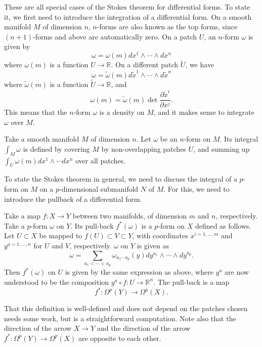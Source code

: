 \documentclass[12pt]{article}
\numberwithin{equation}{section}
\theoremstyle{remark}
\def\bR{\mathbb{R}}
\begin{document}
These are all special cases of the Stokes theorem for differential forms.
To state it, we first need to introduce the integration of a differential form.
On a smooth manifold $M$ of dimension $n$,
$n$-forms are also known as the top forms, 
since $(n+1)$-forms and above are automatically zero.
On a patch $U$, an $n$-form $\omega$ is given by \begin{equation}
\omega = \omega(m) dx^1\wedge \cdots \wedge dx^n
\end{equation} where $\omega(m)$ is a function $U\to \bR$.
On a different patch $\tilde U$, we have \begin{equation}
\omega = \tilde \omega(m) d\tilde x^1\wedge \cdots \wedge d\tilde x^n
\end{equation} where $\tilde \omega(m)$ is a function $\tilde U\to \bR$,
and \begin{equation}
\omega(m) = \tilde \omega(m) \det \frac{\partial \tilde x^i}{\partial x^j}.
\end{equation}
This means that the $n$-form $\omega$ is a density on $M$,
and it makes sense to integrate $\omega$ over $M$.
\begin{definition}
Take a smooth manifold $M$ of dimension $n$.
Let $\omega$ be an $n$-form on $M$.
Its integral $\int_M \omega$ is defined by covering $M$ by non-overlapping patches $U$,
and summing up $\int_U \omega(m) dx^1\wedge \cdots dx^n$ over all patches.
\end{definition}

To state the Stokes theorem in general,
we need to discuss the integral of a $p$-form on $M$ on a $p$-dimensional submanifold $N$ of $M$.
For this, we need to introduce the pullback of a differential form.
\begin{definition}
Take a map $f:X\to Y$ between two manifolds,
of dimension $m$ and $n$, respectively.
Take a $p$-form $\omega$ on $Y$.
Its pull-back $f^*(\omega)$ is a $p$-form on $X$ defined as follows.
Let $U\subset X$ be mapped to $f(U)\subset V \subset Y$,
with coordinates $x^{i=1,\ldots,m}$ and $y^{a=1,\ldots,n}$ for $U$ and $V$, respectively.
$\omega$ on $Y$ is given as \begin{equation}
\omega = \sum_{a_1<\cdots<a_p} \omega_{a_1\cdots a_p}(y) dy^{a_1}\wedge \cdots \wedge dy^{a_p}.
\end{equation}
Then $f^*(\omega)$ on $U$ is given by the same expression as above,
where $y^a$ are now understood to be the composition $y^a\circ f: U\to \bR^n$.
The pull-back is a map \begin{equation}
f^*: \Omega^p(Y)\to \Omega^p(X).
\end{equation}
\end{definition}
That this definition is well-defined and does not depend on the patches chosen 
needs some work, but is a straightforward computation.
Note also that the direction of the arrow $X\to Y$ and the direction of the arrow $f^*: \Omega^p(Y)\to \Omega^p(X)$ are opposite to each other.
\end{document}
